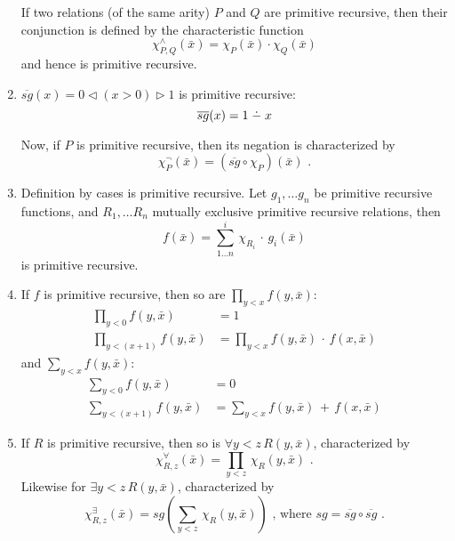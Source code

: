 \documentclass[a4paper,11pt]{article}
\newcommand{\dotmin}{\buildrel\textstyle.\over{\hbox{\vrule height3pt depth0pt width0pt}{\smash-}}}
\begin{document}
\begin{enumerate}
If two relations (of the same arity) $P$ and $Q$ are primitive recursive, then
their conjunction is defined by the characteristic function
\begin{equation*}
  \chi^{\wedge}_{P,Q}(\bar{x}) = \chi_{P}(\bar{x}) \cdot \chi_{Q}(\bar{x})
\end{equation*}
and hence is primitive recursive.


\item %
$\overline{sg}(x) = 0 \lhd (x > 0) \rhd 1$ is primitive recursive:
\begin{equation*}
  \overline{sg}(x) = 1 \dotmin x
\end{equation*}

Now, if $P$ is primitive recursive, then its negation is characterized by
\begin{equation*}
  \chi^{\neg}_{P}(\bar{x}) = (\overline{sg} \circ \chi_P) (\bar{x}) \text{ .}
\end{equation*}


\item %
Definition by cases is primitive recursive. Let $g_1, \ldots g_n$ be primitive
recursive functions, and $R_1, \ldots R_n$ mutually exclusive primitive
recursive relations, then
\begin{equation*}
  f(\bar{x}) = \sum^i_{1 \ldots n} \, \chi_{R_i} \, \cdot \, g_i(\bar{x})
\end{equation*}
is primitive recursive.


\item %
If $f$ is primitive recursive, then so are $\prod_{y < x} f(y, \bar{x})$:
\begin{align*}
  \textstyle{\prod_{y < 0}} f(y, \bar{x})     &= 1\\
  \textstyle{\prod_{y < (x + 1)}} f(y, \bar{x}) &= \textstyle{\prod_{y < x}} f(y, \bar{x}) \, \cdot \, f(x, \bar{x})
\end{align*}
and $\sum_{y < x} f(y, \bar{x})$:
\begin{align*}
  \textstyle{\sum_{y < 0}} f(y, \bar{x})     &= 0\\
  \textstyle{\sum_{y < (x + 1)}} f(y, \bar{x}) &= \textstyle{\sum_{y < x}} f(y, \bar{x}) \, + \, f(x, \bar{x})
\end{align*}


\item %
If $R$ is primitive recursive, then so is $\forall y \! < \! z \, R(y, \bar{x})$, characterized by
\begin{equation*}
  \chi^{\forall}_{R,z}(\bar{x}) = \textstyle{\prod_{y < z}} \, \chi_R(y, \bar{x}) \text{ .}
\end{equation*}
Likewise for $\exists y \! < \! z \, R(y, \bar{x})$, characterized by
\begin{equation*}
  \chi^{\exists}_{R,z}(\bar{x}) = sg( \textstyle{\sum_{y < z}} \, \chi_R(y, \bar{x}) ) \text{ , where } sg = \overline{sg} \circ \overline{sg} \text{ .}
\end{equation*}


\end{enumerate}
\end{document}
